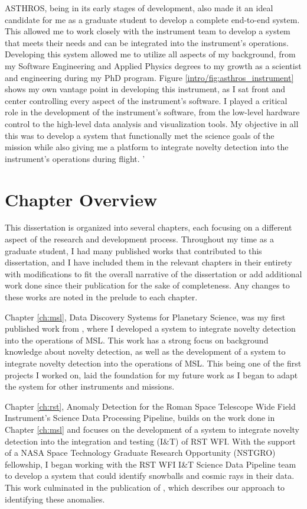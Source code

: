 ASTHROS, being in its early stages of development, also made it an ideal candidate for me as a graduate student to develop a complete end-to-end system.
This allowed me to work closely with the instrument team to develop a system that meets their needs and can be integrated into the instrument's operations.
Developing this system allowed me to utilize all aspects of my background, from my Software Engineering and Applied Physics degrees to my growth as a scientist and engineering during my PhD program.
Figure \ref{intro/fig:asthros_instrument} shows my own vantage point in developing this instrument, as I sat front and center controlling every aspect of the instrument's software. 
I played a critical role in the development of the instrument's software, from the low-level hardware control to the high-level data analysis and visualization tools.
My objective in all this was to develop a system that functionally met the science goals of the mission while also giving me a platform to integrate novelty detection into the instrument's operations during flight. '

\section{Chapter Overview}
This dissertation is organized into several chapters, each focusing on a different aspect of the research and development process.
Throughout my time as a graduate student, I had many published works that contributed to this dissertation, and I have included them in the relevant chapters in their entirety with modifications to fit the overall narrative of the dissertation or add additional work done since their publication for the sake of completeness.
Any changes to these works are noted in the prelude to each chapter.

Chapter \ref{ch:msl}, Data Discovery Systems for Planetary Science,  was my first published work from \cite{horton2021integrating}, where I developed a system to integrate novelty detection into the operations of MSL.
This work has a strong focus on background knowledge about novelty detection, as well as the development of a system to integrate novelty detection into the operations of MSL.
This being one of the first projects I worked on, laid the foundation for my future work as I began to adapt the system for other instruments and missions.

Chapter \ref{ch:rst}, Anomaly Detection for the Roman Space Telescope Wide Field Instrument's Science Data Processing Pipeline, builds on the work done in Chapter \ref{ch:msl} and focuses on the development of a system to integrate novelty detection into the integration and testing (I\&T) of RST WFI.
With the support of a NASA Space Technology Graduate Research Opportunity (NSTGRO) fellowship, I began working with the RST WFI I\&T Science Data Pipeline team to develop a system that could identify snowballs and cosmic rays in their data. 
This work culminated in the publication of \cite{horton2024anomaly}, which describes our approach to identifying these anomalies. 

